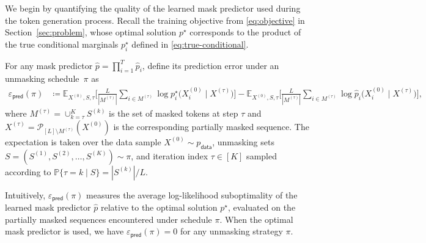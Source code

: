 \documentclass[english]{article}
\newcommand{\defn}{\coloneqq}
\newcommand{\cP}{\mathcal{P}}
\newcommand{\bE}{\mathbb{E}}
\newcommand{\bP}{\mathbb{P}}
\newcommand{\wh}{\widehat}
\newcommand{\data}{\mathsf{data}}
\newcommand{\veps}{\varepsilon}
\newcommand{\E}{\mathbb{E}}
\newcommand{\train}{\mathsf{pred}}
\begin{document}
We begin by quantifying the quality of the learned mask predictor used during the token generation process.
%
Recall the training objective from \eqref{eq:objective} in Section~\ref{sec:problem},
whose optimal solution $p^\star$ corresponds to the product of the true conditional marginals $p_i^\star$ defined in \eqref{eq:true-conditional}. 
\begin{definition}
For any mask predictor $\wh p= \prod_{i=1}^T\wh p_i$, define its prediction error under an unmasking schedule~$\pi$ as
\begin{align} \label{eq:estimate}
    \veps_{\train}(\pi) & \defn {\bE}_{X^{(0)}, S,\tau}\Bigg[\frac{L}{|M^{(\tau)}|}\sum_{i\in M^{(\tau)}} \log p_i^\star\big(X^{(0)}_{i} \mid X^{(\tau)} \big)\Bigg] - {\bE}_{X^{(0)}, S,\tau}\Bigg[\frac{L}{|M^{(\tau)}|}\sum_{i\in M^{(\tau)}} \log \wh p_i\big(X^{(0)}_{i} \mid X^{(\tau)} \big)\Bigg],
    \end{align}
where 
$M^{(\tau)} = \cup_{k=\tau}^K S^{(k)}$ is the set of masked tokens  at step $\tau$ and $X^{(\tau)} = \cP_{[L]\setminus M^{(\tau)}}(X^{(0)})$ is the corresponding partially masked sequence.
The expectation is taken over the data sample $X^{(0)} \sim p_{\data}$, unmasking sets $S = (S^{(1)}, S^{(2)}, \ldots, S^{(K)}) \sim \pi$, and iteration index $\tau\in[K]$ sampled according to
$\bP\{\tau = k \mid S\} = |S^{(k)}|/{L}$.
\end{definition}
Intuitively, $\varepsilon_\train(\pi)$ measures the average log-likelihood suboptimality of the learned mask predictor $\wh p$ relative to the optimal solution $p^\star$, evaluated on the partially masked sequences encountered under schedule $\pi$. When the optimal mask predictor is used, we have $\varepsilon_\train(\pi) = 0$ for any unmasking strategy $\pi$.
\end{document}
